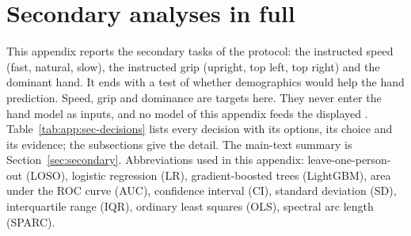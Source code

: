 \section{Secondary analyses in full}\label{app:sec}

This appendix reports the secondary tasks of the protocol: the instructed speed (fast, natural, slow), the
instructed grip (upright, top left, top right) and the dominant hand. It ends with a test of whether demographics
would help the hand prediction. Speed, grip and dominance are targets here. They never enter the hand model as
inputs, and no model of this appendix feeds the displayed \pright{}. Table~\ref{tab:app:sec-decisions} lists
every decision with its options, its choice and its evidence; the subsections give the detail. The main-text
summary is Section~\ref{sec:secondary}. Abbreviations used in this appendix: leave-one-person-out (LOSO),
logistic regression (LR), gradient-boosted trees (LightGBM), area under the ROC curve (AUC), confidence interval
(CI), standard deviation (SD), interquartile range (IQR), ordinary least squares (OLS), spectral arc length
(SPARC).

